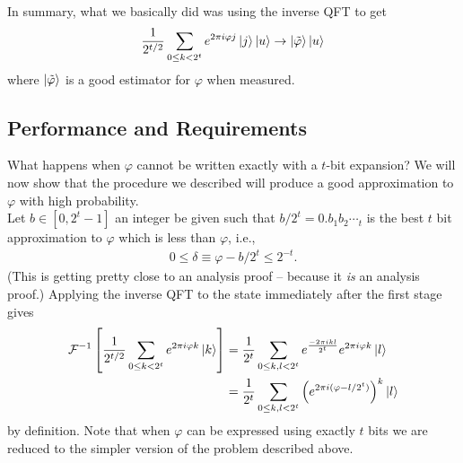 \documentclass{book}
\theoremstyle{definition}
\newcommand{\nn}{\nonumber}
\newcommand{\f}[2]{\frac{#1}{#2}}
\newcommand{\lp}{\left(}
\newcommand{\rp}{\right)}
\newcommand{\lb}{\left[}
\newcommand{\rb}{\right]}
\begin{document}
In summary, what we basically did was using the inverse QFT to get
\begin{align}
\f{1}{2^{t/2}}\sum_{0 \leq k < 2^{t}} e^{2\pi i \varphi j }\ket{j}\ket{u} \to \ket{\tilde{\varphi}}\ket{u}
\end{align}
where $\ket{\tilde\varphi}$ is a good estimator for $\varphi$ when measured. 

 





\subsection{Performance and Requirements}
What happens when $\varphi$ cannot be written exactly with a $t$-bit expansion? We will now show that the procedure we described will produce a good approximation to $\varphi$ with high probability. \\

Let $b \in [0,2^t-1]$ an integer be given such that $b/2^t = 0.b_1b_2\dotsb_t$ is the best $t$ bit approximation to $\varphi$ which is less than $\varphi$, i.e., 
\begin{align}
0 \leq \delta \equiv \varphi - b/2^t \leq 2^{-t}.
\end{align}
(This is getting pretty close to an analysis proof -- because it \textit{is} an analysis proof.) Applying the inverse QFT to the state immediately after the first stage gives
\begin{align}
\mathcal{F}^{-1}\lb\f{1}{2^{t/2}}\sum_{0 \leq k < 2^t}e^{2\pi i \varphi k}\ket{k} \rb &= \f{1}{2^{t}} \sum_{0 \leq k,l < 2^t} e^{\f{-2\pi i kl}{2^t}}e^{2\pi i \varphi k}\ket{l}\nn\\
& = \f{1}{2^t}\sum_{0 \leq k,l < 2^t}\lp e^{2\pi i(\varphi- l/2^t)} \rp^k \ket{l}
\end{align}
by definition. Note that when $\varphi$ can be expressed using exactly $t$ bits we are reduced to the simpler version of the problem described above. \\
\end{document}
